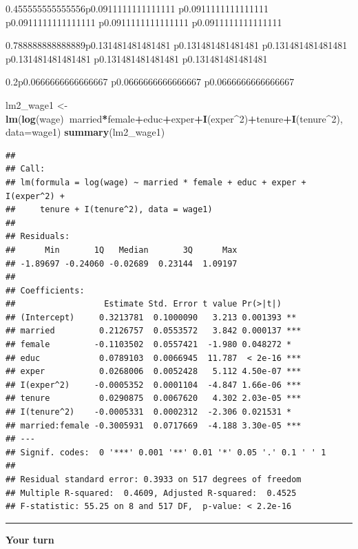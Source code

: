 \documentclass[]{book}
\newenvironment{Shaded}{\begin{snugshade}}{\end{snugshade}}
\newcommand{\DataTypeTok}[1]{\textcolor[rgb]{0.13,0.29,0.53}{#1}}
\newcommand{\DecValTok}[1]{\textcolor[rgb]{0.00,0.00,0.81}{#1}}
\newcommand{\KeywordTok}[1]{\textcolor[rgb]{0.13,0.29,0.53}{\textbf{#1}}}
\newcommand{\NormalTok}[1]{#1}
\newcommand{\OperatorTok}[1]{\textcolor[rgb]{0.81,0.36,0.00}{\textbf{#1}}}
\newcommand{\StringTok}[1]{\textcolor[rgb]{0.31,0.60,0.02}{#1}}
\begin{document}
\begin{tabularx}{0.455555555555556\textwidth}{p{0.0911111111111111\textwidth} p{0.0911111111111111\textwidth} p{0.0911111111111111\textwidth} p{0.0911111111111111\textwidth} p{0.0911111111111111\textwidth}}
\begin{tabularx}{0.788888888888889\textwidth}{p{0.131481481481481\textwidth} p{0.131481481481481\textwidth} p{0.131481481481481\textwidth} p{0.131481481481481\textwidth} p{0.131481481481481\textwidth} p{0.131481481481481\textwidth}}
\begin{tabularx}{0.2\textwidth}{p{0.0666666666666667\textwidth} p{0.0666666666666667\textwidth} p{0.0666666666666667\textwidth}}
\begin{Shaded}
\begin{Highlighting}[]
\NormalTok{lm2_wage1 <-}\StringTok{ }\KeywordTok{lm}\NormalTok{(}\KeywordTok{log}\NormalTok{(wage)}\OperatorTok{~}\NormalTok{married}\OperatorTok{*}\NormalTok{female}\OperatorTok{+}\NormalTok{educ}\OperatorTok{+}\NormalTok{exper}\OperatorTok{+}\KeywordTok{I}\NormalTok{(exper}\OperatorTok{^}\DecValTok{2}\NormalTok{)}\OperatorTok{+}\NormalTok{tenure}\OperatorTok{+}\KeywordTok{I}\NormalTok{(tenure}\OperatorTok{^}\DecValTok{2}\NormalTok{), }\DataTypeTok{data=}\NormalTok{wage1)}
\KeywordTok{summary}\NormalTok{(lm2_wage1)}
\end{Highlighting}
\end{Shaded}

\begin{verbatim}
## 
## Call:
## lm(formula = log(wage) ~ married * female + educ + exper + I(exper^2) + 
##     tenure + I(tenure^2), data = wage1)
## 
## Residuals:
##      Min       1Q   Median       3Q      Max 
## -1.89697 -0.24060 -0.02689  0.23144  1.09197 
## 
## Coefficients:
##                  Estimate Std. Error t value Pr(>|t|)    
## (Intercept)     0.3213781  0.1000090   3.213 0.001393 ** 
## married         0.2126757  0.0553572   3.842 0.000137 ***
## female         -0.1103502  0.0557421  -1.980 0.048272 *  
## educ            0.0789103  0.0066945  11.787  < 2e-16 ***
## exper           0.0268006  0.0052428   5.112 4.50e-07 ***
## I(exper^2)     -0.0005352  0.0001104  -4.847 1.66e-06 ***
## tenure          0.0290875  0.0067620   4.302 2.03e-05 ***
## I(tenure^2)    -0.0005331  0.0002312  -2.306 0.021531 *  
## married:female -0.3005931  0.0717669  -4.188 3.30e-05 ***
## ---
## Signif. codes:  0 '***' 0.001 '**' 0.01 '*' 0.05 '.' 0.1 ' ' 1
## 
## Residual standard error: 0.3933 on 517 degrees of freedom
## Multiple R-squared:  0.4609, Adjusted R-squared:  0.4525 
## F-statistic: 55.25 on 8 and 517 DF,  p-value: < 2.2e-16
\end{verbatim}

\begin{center}\rule{0.5\linewidth}{\linethickness}\end{center}

\textbf{Your turn}


\end{tabularx}
\end{tabularx}
\end{tabularx}
\end{document}

